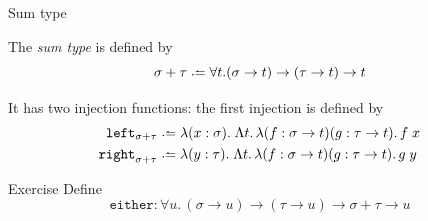 \begin{frame}{Sum type}

\begin{definition}
  The \emph{sum type} is defined by
  \[
    \sigma + \tau \defeq \forall t. (\sigma \to t) \to (\tau \to t) \to t
  \]
\end{definition}
It has two injection functions: the first injection is defined by
\begin{align*}
  \mathtt{left}_{\sigma + \tau} & \defeq \lambda (x : \sigma).\;\Lambda t.\,\lambda (f : \sigma\to
  t)(g : \tau\to t).\, f\;x \\
  \mathtt{right}_{\sigma + \tau} & \defeq \lambda (y : \tau).\;\Lambda t.\,\lambda (f : \sigma\to
  t)(g : \tau\to t).\, g\;y
\end{align*}

%
%

\begin{block}{Exercise}
  Define 
  \[
    \mathtt{either} : \forall u.\, (\sigma \to u) \to (\tau \to u) \to \sigma + \tau \to u
  \] 
\end{block}
\end{frame}

